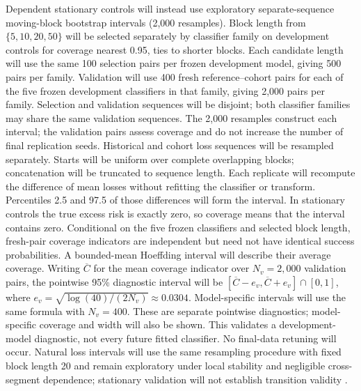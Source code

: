 \documentclass[11pt,a4paper]{article}
\begin{document}
Dependent stationary controls will instead use exploratory separate-sequence
moving-block bootstrap intervals (2,000 resamples). Block length from
$\{5,10,20,50\}$ will be selected separately by classifier family on development
controls for coverage nearest 0.95, ties to shorter blocks. Each candidate
length will use the same 100 selection pairs per frozen development model,
giving 500 pairs per family. Validation will
use 400 fresh reference--cohort pairs for each of the five frozen development
classifiers in that family, giving 2,000 pairs per family. Selection and
validation sequences will be disjoint; both classifier families may share
the same validation sequences. The 2,000 resamples construct each interval;
the validation pairs assess coverage and do not increase the number of final
replication seeds.
Historical and cohort loss sequences will be resampled separately. Starts will
be uniform over complete overlapping blocks; concatenation will be truncated
to sequence length. Each replicate will recompute the difference of mean
losses without refitting the classifier or transform. Percentiles 2.5 and 97.5
of those differences will form the interval. In stationary controls the true
excess risk is exactly zero, so coverage means that the interval contains
zero. Conditional on the five frozen classifiers and selected block length,
fresh-pair coverage indicators are independent but need not have identical
success probabilities. A bounded-mean Hoeffding interval will describe their
average coverage. Writing $\overline C$ for the mean coverage indicator
over $N_v=2{,}000$ validation pairs, the pointwise 95\% diagnostic interval
will be $[\overline C-e_v,\overline C+e_v]\cap[0,1]$, where
$e_v=\sqrt{\log(40)/(2N_v)}\approx0.0304$.
Model-specific intervals will use the same formula with $N_v=400$.
These are separate pointwise diagnostics; model-specific coverage and width
will also be shown.
This validates a development-model diagnostic, not every future fitted
classifier. No final-data retuning will occur. Natural loss intervals will use
the same resampling procedure with fixed block length 20 and remain
exploratory under local stability and negligible cross-segment dependence;
stationary validation will not establish transition validity \cite{kunsch,souza}.
\end{document}
